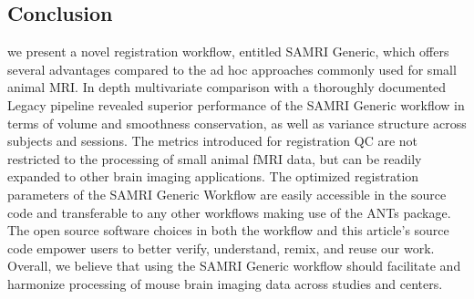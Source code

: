 \subsection{Conclusion}

we present a novel registration workflow, entitled SAMRI Generic, which offers several advantages compared to the ad hoc approaches commonly used for small animal MRI.
In depth multivariate comparison with a thoroughly documented Legacy pipeline revealed superior performance of the SAMRI Generic workflow in terms of volume and smoothness conservation, as well as variance structure across subjects and sessions.
The metrics introduced for registration QC are not restricted to the processing of small animal fMRI data, but can be readily expanded to other brain imaging applications.
The optimized registration parameters of the SAMRI Generic Workflow are easily accessible in the source code and transferable to any other workflows making use of the ANTs package.
The open source software choices in both the workflow and this article's source code empower users to better verify, understand, remix, and reuse our work.
Overall, we believe that using the SAMRI Generic workflow should facilitate and harmonize processing of mouse brain imaging data across studies and centers.
